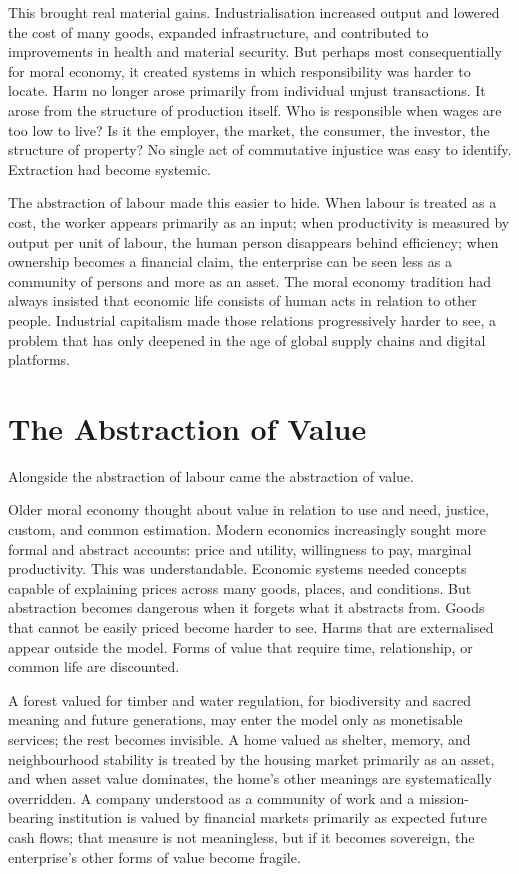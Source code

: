 \documentclass[11pt,a4paper,oneside]{book}
\begin{document}
This brought real material gains. Industrialisation increased output and lowered the cost of many goods, expanded infrastructure, and contributed to improvements in health and material security. But perhaps most consequentially for moral economy, it created systems in which responsibility was harder to locate. Harm no longer arose primarily from individual unjust transactions. It arose from the structure of production itself. Who is responsible when wages are too low to live? Is it the employer, the market, the consumer, the investor, the structure of property? No single act of commutative injustice was easy to identify. Extraction had become systemic.

The abstraction of labour made this easier to hide. When labour is treated as a cost, the worker appears primarily as an input; when productivity is measured by output per unit of labour, the human person disappears behind efficiency; when ownership becomes a financial claim, the enterprise can be seen less as a community of persons and more as an asset. The moral economy tradition had always insisted that economic life consists of human acts in relation to other people. Industrial capitalism made those relations progressively harder to see, a problem that has only deepened in the age of global supply chains and digital platforms.

\section*{The Abstraction of Value}

Alongside the abstraction of labour came the abstraction of value.

Older moral economy thought about value in relation to use and need, justice, custom, and common estimation. Modern economics increasingly sought more formal and abstract accounts: price and utility, willingness to pay, marginal productivity. This was understandable. Economic systems needed concepts capable of explaining prices across many goods, places, and conditions. But abstraction becomes dangerous when it forgets what it abstracts from. Goods that cannot be easily priced become harder to see. Harms that are externalised appear outside the model. Forms of value that require time, relationship, or common life are discounted.

A forest valued for timber and water regulation, for biodiversity and sacred meaning and future generations, may enter the model only as monetisable services; the rest becomes invisible. A home valued as shelter, memory, and neighbourhood stability is treated by the housing market primarily as an asset, and when asset value dominates, the home's other meanings are systematically overridden. A company understood as a community of work and a mission-bearing institution is valued by financial markets primarily as expected future cash flows; that measure is not meaningless, but if it becomes sovereign, the enterprise's other forms of value become fragile.
\end{document}
